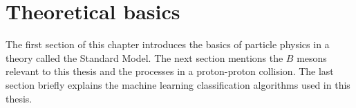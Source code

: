 \chapter{Theoretical basics}

The first section of this chapter introduces the basics of particle physics in a theory called the Standard Model.
The next section mentions the $B$ mesons relevant to this thesis and the processes in a proton-proton collision.
The last section briefly explains the machine learning classification algorithms used in this thesis.




